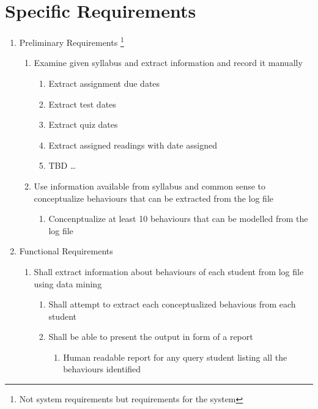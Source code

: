 \documentclass[12pt]{article}
\begin{document}
	\section{Specific Requirements} \label{reqs}
	\begin{enumerate}[label = 3.\arabic*,itemsep=-1mm]
		\item Preliminary Requirements \footnote{Not system requirements but requirements for the system}
		\begin{enumerate}[label* = .\arabic*, itemsep=-1mm] 
			\item Examine given syllabus and extract information and record it manually
			\begin{enumerate}[label* = .\arabic*, itemsep=-1mm] \label{syl}
				\item Extract assignment due dates
				\item Extract test dates
				\item Extract quiz dates
				\item Extract assigned readings with date assigned
				\item TBD \dots
			\end{enumerate}
			\item Use information available from syllabus and common sense to conceptualize behaviours that can be extracted from the log file
			\begin{enumerate}[label* = .\arabic*, itemsep=-1mm] 
				\item Concenptualize at least 10 behaviours that can be modelled from the log file
			\end{enumerate}
		\end{enumerate}
		\item Functional Requirements
		\begin{enumerate}[label* = .\arabic*, itemsep=-1mm] 
			\item Shall extract information about behaviours of each student from log file using data mining \label{aa}
			\begin{enumerate}[label* = .\arabic*, itemsep=-1mm] 
				\item Shall attempt to extract each conceptualized behavious from each student
				\item Shall be able to present the output in form of a report
				\begin{enumerate}[label* = .\arabic*, itemsep=-1mm] 
					\item Human readable report for any query student listing all the behaviours identified
				\end{enumerate}

\end{enumerate}
\end{enumerate}
\end{enumerate}
\end{document}
